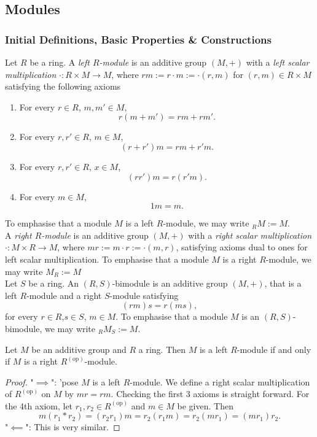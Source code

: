 \subsection{Modules}
\subsubsection{Initial Definitions, Basic Properties \& Constructions}
\begin{definition}
    Let $R$ be a ring. A \textit{left $R$-module} is an additive group $(M,+)$ with a \textit{left scalar multiplication} $\cdot : R \times M \rightarrow M$, where $rm := r\cdot m := \cdot(r,m)$ for $(r,m)\in R\times M$ satisfying the following axioms
    \begin{enumerate}
        \item For every $r\in R$, $m,m'\in M$,
        $$r(m+m')=rm+rm'.$$
        \item For every $r,r'\in R$, $m\in M$,
        $$(r+r')m = rm+r'm.$$
        \item For every $r,r'\in R$, $x\in M$,
        $$(rr')m=r(r'm).$$
        \item For every $m\in M$,
        $$1m = m.$$
    \end{enumerate}
    To emphasise that a module $M$ is a left $R$-module, we may write $_RM:= M$.\\
    A \textit{right $R$-module} is an additive group $(M,+)$ with a \textit{right scalar multiplication} $\cdot : M\times R \rightarrow M$, where $mr := m\cdot r := \cdot(m,r)$, satisfying axioms dual to ones for left scalar multiplication.  To emphasise that a module $M$ is a right $R$-module, we may write $M_R := M$\\
    Let $S$ be a ring. An $(R,S)$-bimodule is an additive group $(M,+)$, that is a left $R$-module and a right $S$-module satisfying 
    $$(rm)s = r(ms),$$
    for every $r\in R$,$s\in S$, $m\in M$. To emphasise that a module $M$ is an $(R,S)$-bimodule, we may write $_RM_S := M$.
\end{definition}
\begin{lemma}\label{SufficientToCheckLeftCase}
    Let $M$ be an additive group and $R$ a ring. Then $M$ is a left $R$-module if and only if $M$ is a right $R^{(\text{op})}$-module.
\end{lemma}
\begin{proof}
    "$\implies$": 'pose $M$ is a left $R$-module. We define a right scalar multiplication of $R^{(\text{op})}$ on $M$ by $mr = rm$. Checking the first 3 axioms is straight forward. For the 4th axiom, let $r_1,r_2\in R^{(\text{op})}$ and $m\in M$ be given. Then 
    $$m(r_1\ast r_2) = (r_2r_1)m=r_2(r_1m)=r_2(mr_1) = (mr_1)r_2.$$
    "$\impliedby$": This is very similar.
\end{proof}
